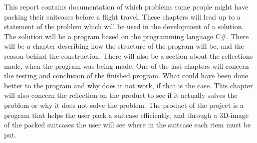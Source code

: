 This report contains documentation of which problems some people might have packing their suitcases before a flight travel. These chapters will lead up to a statement of the problem which will be used in the development of a solution.
\newline
The solution will be a program based on the programming language C\#. There will be a chapter describing how the structure of the program will be, and the reason behind the construction. There will also be a section about the reflections made, when the program was being made.
\newline
One of the last chapters will concern the testing and conclusion of the finished program. What could have been done better to the program and why does it not work, if that is the case. This chapter will also concern the reflection on the product to see if it actually solves the problem or why it does not solve the problem.
\newline
The product of the project is a program that helps the user pack a suitcase efficiently, and through a 3D-image of the packed suitcases the user will see where in the suitcase each item must be put.